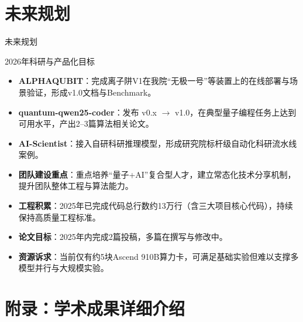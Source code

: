\documentclass[aspectratio=169]{beamer} %
\begin{document}
\section{未来规划}
\begin{frame}{未来规划}
    \begin{block}{2026年科研与产品化目标}
        \begin{itemize}
            \item \textbf{ALPHAQUBIT}：完成离子阱V1在我院“无极一号”等装置上的在线部署与场景验证，形成v1.0文档与Benchmark。
            \item \textbf{quantum-qwen25-coder}：发布 v0.x $\rightarrow$ v1.0，在典型量子编程任务上达到可用水平，产出2–3篇算法相关论文。
            \item \textbf{AI-Scientist}：接入自研科研推理模型，形成研究院标杆级自动化科研流水线案例。
        \end{itemize}
    \end{block}
    
    \begin{itemize}
        \item \textbf{团队建设重点}：重点培养“量子+AI”复合型人才，建立常态化技术分享机制，提升团队整体工程与算法能力。
        \item \textbf{工程积累}：2025年已完成代码总行数约13万行（含三大项目核心代码），持续保持高质量工程标准。
        \item \textbf{论文目标}：2025年内完成2篇投稿，多篇在撰写与修改中。
        \item \textbf{资源诉求}：当前仅有约5块Ascend 910B算力卡，可满足基础实验但难以支撑多模型并行与大规模实验。
    \end{itemize}
\end{frame}



\appendix
\section{附录：学术成果详细介绍}
\end{document}
